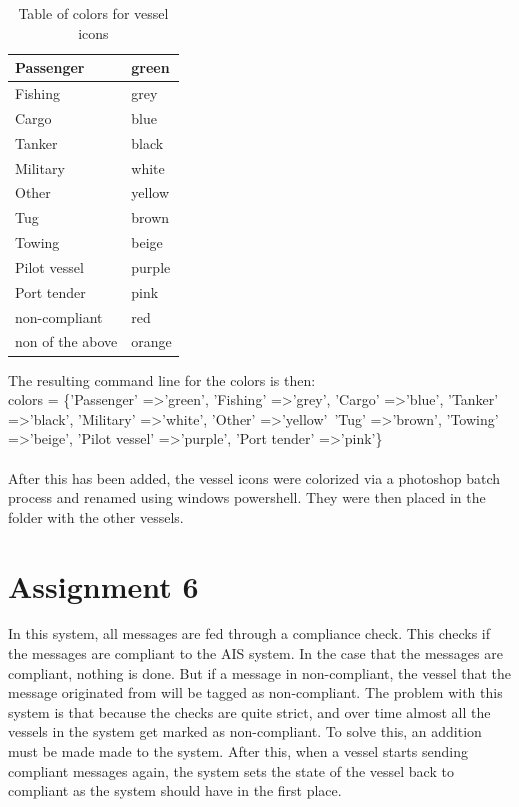 \documentclass[12pt]{article}
\begin{document}
\begin{table}
\centering

\begin{tabular}{|l|l|}
	\hline
	Passenger & green \\
	\hline
	Fishing & grey \\
	\hline
	Cargo & blue \\
	\hline
	Tanker & black \\
	\hline
	Military & white \\
	\hline
	Other & yellow \\
	\hline
	Tug & brown \\
	\hline
	Towing & beige \\
	\hline
	Pilot vessel & purple \\
	\hline
	Port tender & pink \\
	\hline
	non-compliant & red \\
	\hline
	non of the above & orange \\
	\hline
\end{tabular}
\caption{Table of colors for vessel icons}
\label{colortable}
\end{table}

The resulting command line for the colors is then:
\\
    colors = \{'Passenger' =\textgreater 'green', 'Fishing' =\textgreater 'grey', 'Cargo' =\textgreater 'blue', 'Tanker' =\textgreater 'black', 'Military' =\textgreater 'white', 'Other' =\textgreater 'yellow'\, 'Tug' =\textgreater 'brown', 'Towing' =\textgreater 'beige', 'Pilot vessel' =\textgreater 'purple', 'Port tender' =\textgreater 'pink'\}
\\
\\
After this has been added, the vessel icons were colorized via a photoshop batch process and renamed using windows powershell. They were then placed in the folder with the other vessels.
	


\section*{Assignment 6}
In this system, all messages are fed through a compliance check. This checks if the messages are compliant to the AIS system. In the case that the messages are compliant, nothing is done. But if a message in non-compliant, the vessel that the message originated from will be tagged as non-compliant. The problem with this system is that because the checks are quite strict, and over time almost all the vessels in the system get marked as non-compliant. To solve this, an addition must be made made to the system. After this, when a vessel starts sending compliant messages again, the system sets the state of the vessel back to compliant as the system should have in the first place.
\end{document}
